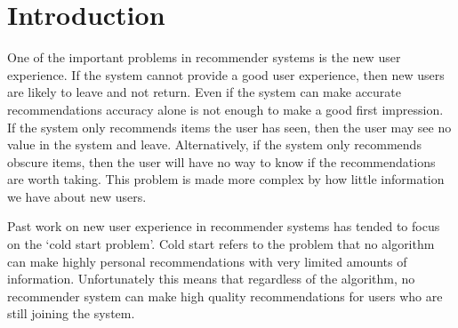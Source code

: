 \documentclass[letterpaper]{sig-alternate}
\begin{document}


\section{Introduction}

  One of the important problems in recommender systems is the new user experience.
  If the system cannot provide a good user experience, then new users are likely to leave and not return.
  Even if the system can make accurate recommendations accuracy alone is not enough to make a good first impression.
  If the system only recommends items the user has seen, then the user may see no value in the system and leave.
  Alternatively, if the system only recommends obscure items, then the user will have no way to know if the recommendations are worth taking.
  This problem is made more complex by how little information we have about new users.
  

  Past work on new user experience in recommender systems has tended to focus on the `cold start problem'.
  Cold start refers to the problem that no algorithm can make highly personal recommendations with very limited amounts of information.
  Unfortunately this means that regardless of the algorithm, no recommender system can make high quality recommendations for users who are still joining the system.
  
\end{document}
